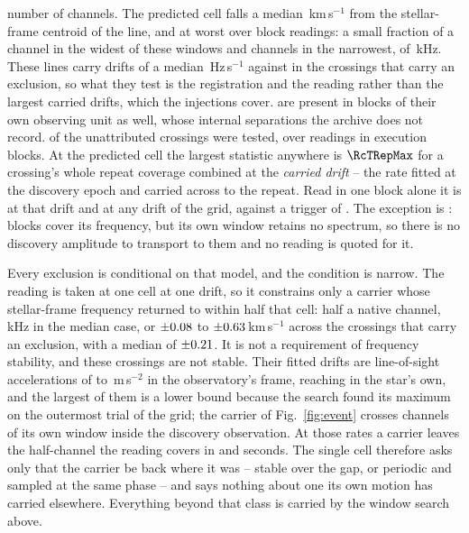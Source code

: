 number of channels. The predicted cell falls a median
\RgCenMedKms\,km\,s$^{-1}$ from the stellar-frame centroid of the line, and
\RgCenMaxKms{} at worst over \RgCenNBlock{} block readings: a small fraction
of a channel in the widest of these windows and \RgOffMaxCh{} channels in
the narrowest, of \RgOffMaxChanKHz\,kHz. These lines
carry drifts of a median \LrDriftMedLine\,Hz\,s$^{-1}$ against
\LrDriftMedExcl{} in the crossings that carry an exclusion, so what they test
is the registration and the reading rather than the largest carried drifts,
which the injections cover. \QcNUnrecWord{} are present
in blocks of their own observing unit as well, whose internal separations the
archive does not record. \RcNExclPoss{} of the \RcNTested{} unattributed crossings were tested,
over \RcNRepeatMeas{} readings in \RcNRepeatBlock{} execution blocks. At the
predicted cell the largest statistic anywhere is $\RcTRepMax$ for a crossing's
whole repeat coverage combined at the \emph{carried drift} -- the rate fitted
at the discovery epoch and carried across to the repeat. Read in one block
alone it is \RcTMatched{} at that drift and \RcTMax{} at any drift of the
grid, against a trigger of \StageNullTrig. The exception is \RcUntStar{} \texttt{\RcUntEb}:
\RcUntNRep{} blocks cover its frequency, but its own window retains no
spectrum, so there is no discovery amplitude to transport to them and no
reading is quoted for it.

Every exclusion is conditional on that model, and the condition is narrow. The reading is taken at one cell at one drift, so it constrains only a
carrier whose stellar-frame frequency returned to within half that cell:
half a native channel, \RqHalfChanKHz\,kHz in the median case, or
$\pm0.08$ to $\pm0.63$\,km\,s$^{-1}$ across the \RcNExcl{}
crossings that carry an exclusion, with a median of $\pm0.21$. It is not a requirement of frequency stability, and these crossings are
not stable. Their fitted drifts are line-of-sight accelerations of
\ZtALosLo{} to \ZtALosHi\,m\,s$^{-2}$ in the observatory's frame, reaching
\EgStarALosHi{} in the star's own, and the largest of them is a lower bound
because the search found its maximum on the outermost trial of the grid; the
carrier of
Fig.~\ref{fig:event} crosses \EvADriftChan{} channels of its own window
inside the discovery observation. At those rates a carrier leaves the
half-channel the reading covers in \ZtSxLeaveSec{} and \ZtCpLeaveSec{}
seconds. The single cell therefore asks
only that the carrier be back where it was -- stable over the gap, or
periodic and sampled at the same phase -- and says nothing about one its own
motion has carried elsewhere. Everything beyond that class is carried by the window search above.

